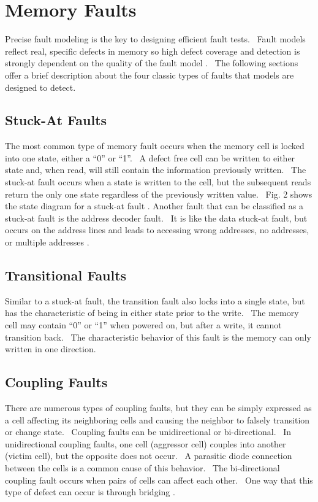 \section{Memory Faults}
\label{sect:bg-faults}
Precise fault modeling is the key to designing efficient fault tests.  Fault models reflect real, specific defects in memory so high defect coverage and detection is strongly dependent on the quality of the fault model \cite{1327984}.  The following sections offer a brief description about the four classic types of faults \cite{Adams2003} that models are designed to detect.  

\subsection{Stuck-At Faults}
The most common type of memory fault occurs when the memory cell is locked into one state, either a “0” or “1”.  A defect free cell can be written to either state and, when read, will still contain the information previously written.  The stuck-at fault occurs when a state is written to the cell, but the subsequent reads return the only one state regardless of the previously written value.  Fig. 2 shows the state diagram for a stuck-at fault \cite{oldref-03}.
Another fault that can be classified as a stuck-at fault is the address decoder fault.  It is like the data stuck-at fault, but occurs on the address lines and leads to accessing wrong addresses, no addresses, or multiple addresses \cite{oldref-03}.

\subsection{Transitional Faults}
Similar to a stuck-at fault, the transition fault also locks into a single state, but has the characteristic of being in either state prior to the write.  The memory cell may contain “0” or “1” when powered on, but after a write, it cannot transition back.  The characteristic behavior of this fault is the memory can only written in one direction.  

\subsection{Coupling Faults}
There are numerous types of coupling faults, but they can be simply expressed as a cell affecting its neighboring cells and causing the neighbor to falsely transition or change state.  Coupling faults can be unidirectional or bi-directional.  In unidirectional coupling faults, one cell (aggressor cell) couples into another (victim cell), but the opposite does not occur.  A parasitic diode connection between the cells is a common cause of this behavior.  The bi-directional coupling fault occurs when pairs of cells can affect each other.  One way that this type of defect can occur is through bridging \cite{Adams2003}.  

